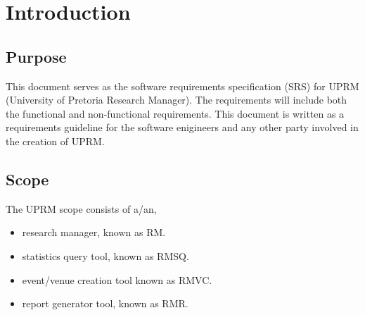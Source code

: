 \section{Introduction}

	\subsection{Purpose}
		This document serves as the software requirements specification (SRS) for UPRM (University of Pretoria Research Manager). 
		The requirements will include both the functional and non-functional requirements. 
		This document is written as a requirements guideline for the software enigineers and any other party involved in the creation of UPRM.

	\subsection{Scope}
		\begin{paragraph}{The UPRM scope consists of a/an,}
			\begin{itemize}
				\item research manager, known as RM.
				\item statistics query tool, known as RMSQ.
				\item event/venue creation tool known as RMVC.
				\item report generator tool, known as RMR.\\
			\end{itemize}
		\end{paragraph}

